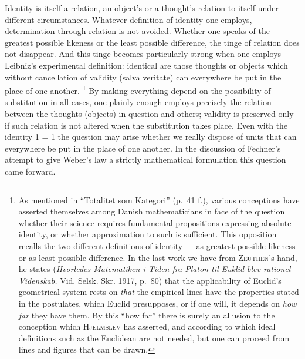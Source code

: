 \documentclass[12pt]{article}
\newcommand{\opage}[1]{\marginnote{\footnotesize\textit{[#1]}}}
\begin{document}
Identity is itself a relation, an object's or a thought's relation to itself
under different circumstances. Whatever definition of identity one employs,
determination through relation is not avoided. Whether one speaks of the
greatest possible likeness or the least possible difference, the tinge of
relation does not disappear. And this tinge becomes particularly strong when
one employs Leibniz's experimental definition: identical are those thoughts
or objects which without cancellation of validity (salva veritate) can
everywhere be put in the place of one another.%
\footnote{As mentioned in ``Totalitet som Kategori'' (p.~41 f.), various
conceptions have asserted themselves among Danish mathematicians in face of
the question whether their science requires fundamental propositions
expressing absolute identity, or whether approximation to such is
sufficient. This opposition recalls the two different definitions of
identity --- as greatest possible likeness or as least possible difference.
In the last work we have from \textsc{Zeuthen}'s hand, he states
(\textit{Hvorledes Matematiken i Tiden fra Platon til Euklid blev rationel
Videnskab.} Vid. Selsk. Skr. 1917, p.~80) that the applicability of Euclid's
geometrical system rests on \emph{that} the empirical lines have the
properties stated in the postulates, which Euclid presupposes, or if one
will, it depends on \emph{how far} they have them. By this ``how far'' there
is surely an allusion to the conception which \textsc{Hjelmslev} has
asserted, and according to which ideal definitions such as the Euclidean are
not needed, but one can proceed from lines and figures that can be drawn.}
By making everything depend on the \opage{41}possibility of substitution in all cases,
one plainly enough employs precisely the relation between the thoughts
(objects) in question and others; validity is preserved only if such
relation is not altered when the substitution takes place. Even with the
identity 1 = 1 the question may arise whether we really dispose of units
that can everywhere be put in the place of one another. In the discussion of
Fechner's attempt to give Weber's law a strictly mathematical formulation
this question came forward.
\end{document}
